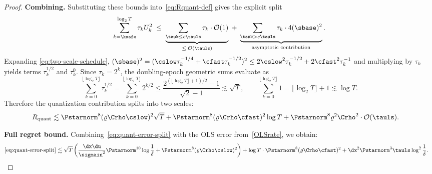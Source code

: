 \documentclass[11pt,journal,onecolumn]{IEEEtran}
\begin{document}
\begin{proof}
    \medskip\noindent\textbf{Combining.}
    Substituting these bounds into~\eqref{eq:Rquant-def} gives the explicit split
    \begin{equation}\label{eq:Uk2-split}
        \sum_{k=\ksafe}^{\log_2 T} \tau_k U_k^2
        \;\le\;
        \underbrace{\sum_{\tauk \le c\tauls} \tau_k \cdot \mathcal{O}(1)}_{\le\; \mathcal{O}(\tauls)}
        \;+\;
        \underbrace{\sum_{\tauk > c\tauls} \tau_k \cdot 4(\sbase)^2}_{\text{asymptotic contribution}}.
    \end{equation}
    Expanding \eqref{eq:two-scale-schedule}, $(\sbase)^2 = (\cslow\tau_k^{-1/4} + \cfast\tau_k^{-1/2})^2 \le 2\cslow^2\tau_k^{-1/2} + 2\cfast^2\tau_k^{-1}$ and multiplying by $\tau_k$ yields terms $\tau_k^{1/2}$ and $\tau_k^0$. Since $\tau_k = 2^k$, the doubling-epoch geometric sums evaluate as
    \begin{equation}\label{eq:doubling-sums}
        \sum_{k=0}^{\lfloor \log_2 T \rfloor} \tau_k^{1/2} = \sum_{k=0}^{\lfloor \log_2 T \rfloor} 2^{k/2} \le \frac{2^{(\lfloor \log_2 T \rfloor+1)/2}-1}{\sqrt{2}-1} \lesssim \sqrt{T}, \qquad
        \sum_{k=0}^{\lfloor \log_2 T \rfloor} 1 = \lfloor \log_2 T \rfloor + 1 \lesssim \log T.
    \end{equation}
    Therefore the quantization contribution splits into two scales:
    \begin{align}
        R_{\mathrm{quant}}
         &\lesssim \Pstarnorm^8 (\varrho \Crho \cslow)^2 \sqrt{T} + \Pstarnorm^8 (\varrho \Crho \cfast)^2 \log T + \Pstarnorm^8 \varrho^2 \Crho^2 \cdot \mathcal{O}(\tauls). \label{eq:two-scale-regret-decomp}
    \end{align}

    \medskip\noindent\textbf{Full regret bound.}
    Combining~\eqref{eq:quant-error-split} with the OLS error from~\eqref{OLSrate}, we obtain:
    \begin{align}
        \eqref{eq:quant-error-split} &\lesssim \sqrt T \left(\frac{\dx\du}{\sigmain^2} \Pstarnorm^{10} \log \frac{1}{\delta} + \Pstarnorm^{8} (\varrho \Crho \cslow)^2 \right) + \log T \cdot \Pstarnorm^{8} (\varrho \Crho \cfast)^2 + \dx^2 \Pstarnorm^3 \tauls \log^2\frac{1}{\delta}.
    \end{align}


\end{proof}
\end{document}
